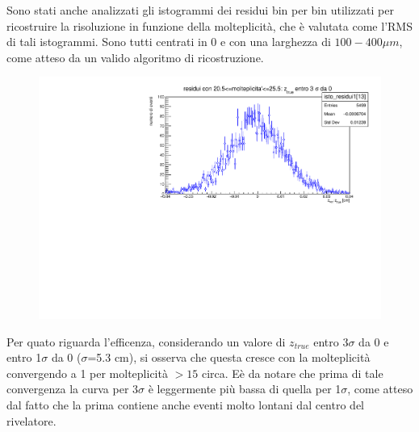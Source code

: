 \documentclass{article}
\begin{document}
\noindent
Sono stati anche analizzati gli istogrammi dei residui bin per bin utilizzati per ricostruire la risoluzione in funzione della molteplicità, che è valutata come l'RMS di tali istogrammi. Sono tutti centrati in $0$ e con una larghezza di $100-400 \mu m$, come atteso da un valido algoritmo di ricostruzione.
\begin{figure}[H]
	\centering
	\includegraphics[scale=0.5]{resmulti20}

\end{figure}
\noindent
Per quato riguarda l'efficenza, considerando un valore di $z_{true}$ entro 3$\sigma$ da $0$ e entro 1$\sigma$ da 0 ($\sigma$=5.3 cm), si osserva che questa cresce con la molteplicità convergendo a 1 per molteplicità $>15$ circa.
Eè da notare che prima di tale convergenza la curva per 3$\sigma$ è leggermente più bassa di quella per 1$\sigma$, come atteso dal fatto che la prima contiene anche eventi molto lontani dal centro del rivelatore.
\end{document}
